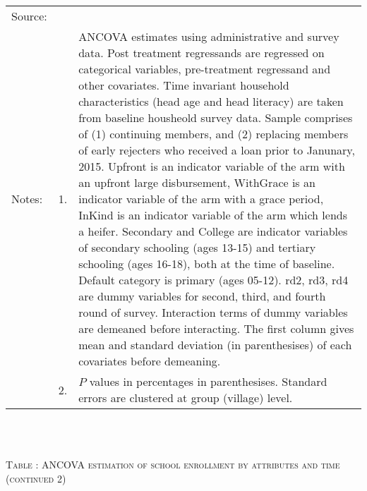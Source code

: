 \begin{minipage}[t]{14cm}
\setlength{\tabcolsep}{1pt} \begin{tabular}{>{\hfill\scriptsize}p{1cm}<{}>{\hfill\scriptsize}p{.25cm}<{}>{\scriptsize}p{12cm}<{\hfill}} 
Source:& \multicolumn{2}{l}{\scriptsize Estimated with GUK administrative and survey data.}\\
Notes: & 1. & ANCOVA estimates using administrative and survey data. Post treatment regressands are regressed on categorical variables, pre-treatment regressand and other covariates. Time invariant household characteristics (head age and head literacy) are taken from baseline housheold survey data. Sample comprises of (1) continuing members, and (2) replacing members of early rejecters who received a loan prior to Janunary, 2015.  \textsf{Upfront} is an indicator variable of the arm with an upfront large disbursement, \textsf{WithGrace} is an indicator variable of the arm with a grace period, \textsf{InKind} is an indicator variable of the arm which lends a heifer. \textsf{Secondary} and \textsf{College} are indicator variables of secondary schooling (ages 13-15) and tertiary schooling (ages 16-18), both at the time of baseline. Default category is primary (ages 05-12). \textsf{rd2, rd3, rd4} are dummy variables for second, third, and fourth round of survey. Interaction terms of dummy variables are demeaned before interacting. The first column gives mean and standard deviation (in parenthesises) of each covariates before demeaning. \\
& 2. & $P$ values in percentages in parenthesises. Standard errors are clustered at group (village) level. %
 \end{tabular}
\end{minipage} \\\\\hspace{-1cm}\begin{minipage}[t]{14cm} \hfil\textsc{\normalsize Table \thetable: ANCOVA estimation of school enrollment by attributes and time (continued 2)\label{tab ANCOVA enroll time varying attributes3}}\\ \setlength{\tabcolsep}{1pt}
  \setlength{\baselineskip}{8pt}
  \renewcommand{\arraystretch}{.55}
  \hfil{}
\end{minipage}
